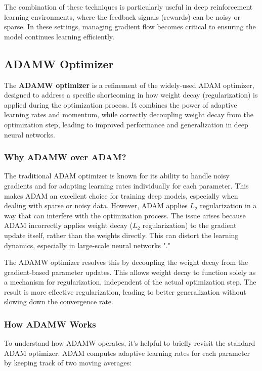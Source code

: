 The combination of these techniques is particularly useful in deep reinforcement learning environments, where the feedback signals (rewards) can be noisy or sparse. In these settings, managing gradient flow becomes critical to ensuring the model continues learning efficiently.

\subsection*{ADAMW Optimizer}

The \textbf{ADAMW optimizer} is a refinement of the widely-used ADAM optimizer, designed to address a specific shortcoming in how weight decay (regularization) is applied during the optimization process. It combines the power of adaptive learning rates and momentum, while correctly decoupling weight decay from the optimization step, leading to improved performance and generalization in deep neural networks.

\subsubsection*{Why ADAMW over ADAM?}

The traditional ADAM optimizer is known for its ability to handle noisy gradients and for adapting learning rates individually for each parameter. This makes ADAM an excellent choice for training deep models, especially when dealing with sparse or noisy data. However, ADAM applies $L_2$ regularization in a way that can interfere with the optimization process. The issue arises because ADAM incorrectly applies weight decay ($L_2$ regularization) to the gradient update itself, rather than the weights directly. This can distort the learning dynamics, especially in large-scale neural networks "\cite{loshchilov2019decoupledweightdecayregularization}."

The ADAMW optimizer resolves this by decoupling the weight decay from the gradient-based parameter updates. This allows weight decay to function solely as a mechanism for regularization, independent of the actual optimization step. The result is more effective regularization, leading to better generalization without slowing down the convergence rate.

\subsubsection*{How ADAMW Works}

To understand how ADAMW operates, it’s helpful to briefly revisit the standard ADAM optimizer. ADAM computes adaptive learning rates for each parameter by keeping track of two moving averages:

